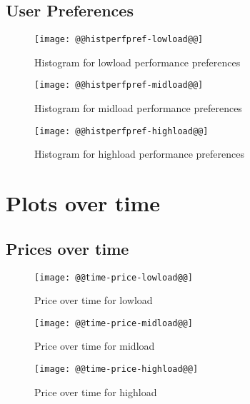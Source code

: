 \documentclass[11pt]{article}
\begin{document}
\newpage
\subsection{User Preferences}
\begin{figure}[htbp]
  \begin{center}
    \texttt{[image: @@histperfpref-lowload@@]}
    \caption{Histogram for lowload performance preferences}
    \label{fig:histperfpref-lowload}
  \end{center}
\end{figure}
\begin{figure}[htbp]
  \begin{center}
    \texttt{[image: @@histperfpref-midload@@]}
    \caption{Histogram for midload performance preferences}
    \label{fig:histperfpref-midload}
  \end{center}
\end{figure}
\begin{figure}[htbp]
  \begin{center}
    \texttt{[image: @@histperfpref-highload@@]}
    \caption{Histogram for highload performance preferences}
    \label{fig:histperfpref-highload}
  \end{center}
\end{figure}

\newpage
\section{Plots over time}
\subsection{Prices over time}
\begin{figure}[htbp]
  \begin{center}
    \texttt{[image: @@time-price-lowload@@]}
    \caption{Price over time for lowload}
    \label{fig:time-price-lowload}
  \end{center}
\end{figure}
\begin{figure}[htbp]
  \begin{center}
    \texttt{[image: @@time-price-midload@@]}
    \caption{Price over time for midload}
    \label{fig:time-price-midload}
  \end{center}
\end{figure}
\begin{figure}[htbp]
  \begin{center}
    \texttt{[image: @@time-price-highload@@]}
    \caption{Price over time for highload}
    \label{fig:time-price-highload}
  \end{center}
\end{figure}
\end{document}

